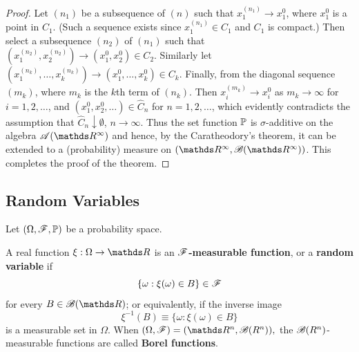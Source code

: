 \begin{unexaminable}
\begin{proof}
Let $(n_1)$ be a subsequence of $(n)$ such that $x_1^{(n_1)} \to x_1^{0}$, where $x_1^0$ is a point in $C_1$. (Such a sequence exists since $x_1^{(n_1)} \in C_1$ and $C_1$ is compact.) Then select a subsequence $(n_2)$ of $(n_1)$ such that $(x_1^{(n_2)}, x_2^{(n_2)}) \to (x_1^0, x_2^0) \in C_2$. Similarly let $(x_1^{(n_k)}, \dots, x_k^{(n_k)}) \to (x_1^0,\dots,  x_k^0) \in C_k$. Finally, from the diagonal sequence $(m_k)$, where $m_k$ is the $k$th term of $(n_k)$. Then $x_i^{(m_k)} \to x_i^0$ as $m_k \to \infty$ for $i=1,2, \dots$, and $(x_1^0, x_2^0, \dots)\in \hat{C}_n$ for $n = 1,2,\dots$, which evidently contradicts the assumption that $\hat{C}_n \downarrow \emptyset$, $n \to \infty$. Thus the set function $\mathbb{P}$ is $\sigma$-additive on the algebra $\mathcal{A}(\R^\infty)$ and hence, by the Caratheodory's theorem, it can be extended to a (probability) measure on $(\R^\infty, \B(\R^\infty))$. This completes the proof of the theorem.
\end{proof}
\end{unexaminable}


\subsection{Random Variables}
Let $(\Omega, \mathcal{F}, \mathbb{P})$ be a probability space.

\begin{definition}
A real function $\xi: \Omega \rightarrow \R$ is an \textbf{$\mathcal{F}$-measurable function}, or a \textbf{random variable} if
\begin{equation*}
    \{ \omega: \xi(\omega) \in B \} \in \mathcal{F}
\end{equation*}
for every $B \in \B(\R)$; or equivalently, if the inverse image
\begin{equation*}
    \xi^{-1}(B) \equiv \{ \omega: \xi(\omega) \in B \}
\end{equation*}
is a measurable set in $\Omega$. When $(\Omega, \F) = (\R^n, \B(R^n)),$ the $\mathcal{B}(R^n)$-measurable functions are called \textbf{Borel functions}.
\end{definition}

